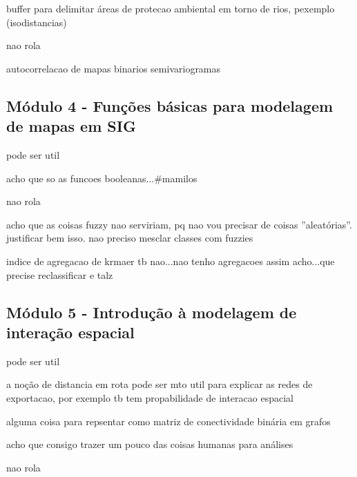 buffer para delimitar áreas de protecao ambiental em torno de rios, pexemplo (isodistancias)


nao rola

autocorrelacao de mapas binarios
semivariogramas

\subsection{Módulo 4 - Funções básicas para modelagem de mapas em SIG}

pode ser util

acho que so as funcoes booleanas...\#mamilos

nao rola

acho que as coisas fuzzy nao serviriam, pq nao vou precisar de coisas ''aleatórias''. justificar bem isso. nao preciso mesclar classes com fuzzies

indice de agregacao de krmaer tb nao...nao tenho agregacoes assim acho...que precise reclassificar e talz

\subsection{Módulo 5 - Introdução à modelagem de interação espacial}

pode ser util

a noção de distancia em rota pode ser mto util para explicar as redes de exportacao, por exemplo
tb tem propabilidade de interacao espacial

alguma coisa para repsentar como matriz de conectividade binária em grafos

acho que consigo trazer um pouco das coisas humanas para análises

nao rola



